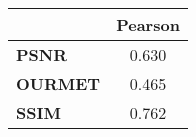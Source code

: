 \begin{tabular}{|l|c|}
\hline
&\textbf{Pearson}\\\hline
\textbf{PSNR}&0.630\\\hline
\textbf{OURMET}&0.465\\\hline
\textbf{SSIM}&0.762\\\hline
\end{tabular}
